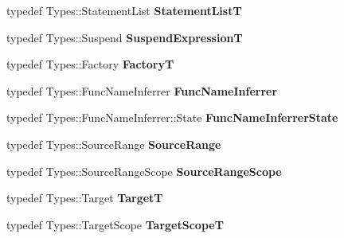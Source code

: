 \begin{DoxyCompactItemize}
\mbox{\label{classv8_1_1internal_1_1ParserBase_a954c416a2b1f92d82deea78646726d6a}} 
typedef Types\+::\+Statement\+List {\bfseries Statement\+ListT}
\item 
\mbox{\label{classv8_1_1internal_1_1ParserBase_aa7be7e86add48d03a607d5b9a7d8eee5}} 
typedef Types\+::\+Suspend {\bfseries Suspend\+ExpressionT}
\item 
\mbox{\label{classv8_1_1internal_1_1ParserBase_a043e805b31ed2bb00ec42e6f261bec37}} 
typedef Types\+::\+Factory {\bfseries FactoryT}
\item 
\mbox{\label{classv8_1_1internal_1_1ParserBase_a8d3901937325521f34291329762ed451}} 
typedef Types\+::\+Func\+Name\+Inferrer {\bfseries Func\+Name\+Inferrer}
\item 
\mbox{\label{classv8_1_1internal_1_1ParserBase_a24292125c3492678d541567cc7683b7f}} 
typedef Types\+::\+Func\+Name\+Inferrer\+::\+State {\bfseries Func\+Name\+Inferrer\+State}
\item 
\mbox{\label{classv8_1_1internal_1_1ParserBase_a8efa0be86c93e585069513a646abe6b5}} 
typedef Types\+::\+Source\+Range {\bfseries Source\+Range}
\item 
\mbox{\label{classv8_1_1internal_1_1ParserBase_a7925996d4f293d1c5c61798334f063a0}} 
typedef Types\+::\+Source\+Range\+Scope {\bfseries Source\+Range\+Scope}
\item 
\mbox{\label{classv8_1_1internal_1_1ParserBase_a9d233c888962c64e8555826eea2d44a9}} 
typedef Types\+::\+Target {\bfseries TargetT}
\item 
\mbox{\label{classv8_1_1internal_1_1ParserBase_a8b5bc320faad1535746857277a34ab9c}} 
typedef Types\+::\+Target\+Scope {\bfseries Target\+ScopeT}
\end{DoxyCompactItemize}

